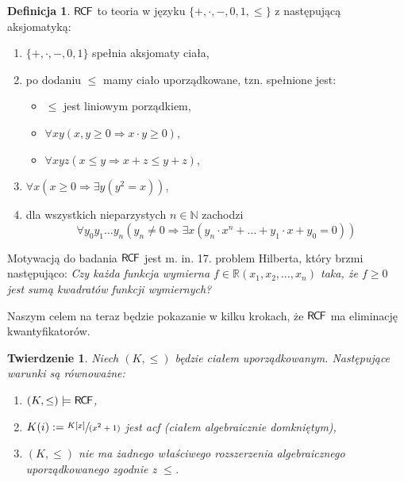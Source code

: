 \documentclass{article}
\newcommand{\N}{\mathbb{N}}
\newcommand{\R}{\mathbb{R}}
\theoremstyle{plain}
\newtheorem{tw}[thm]{Twierdzenie}
\theoremstyle{definition}
\newtheorem{df}[thm]{Definicja}
\theoremstyle{remark}
\newcommand{\RCF}{\mathsf{R \mkern-1.7mu C \mkern-1.4mu F}}
\begin{document}
\begin{df}
	 $\RCF$ to teoria w języku $\{ +, \cdot, -, 0, 1, \leq \}$
	 z następującą aksjomatyką:
	 \begin{enumerate}
		 \item $ \{+, \cdot, -, 0, 1\} $ spełnia aksjomaty ciała,
		 \item po dodaniu $\leq $ mamy ciało uporządkowane, tzn.
			 spełnione jest:
			 \begin{itemize}
				 \item $ \leq $ jest liniowym porządkiem,
				 \item $ \forall x y (x, y \geq 0 \Rightarrow
					 x\cdot y \geq 0) $,
				 \item $\forall x y z (x \leq y \Rightarrow x +
					 z \leq y + z ) $,
			 \end{itemize}

		 \item $ \forall x (x \geq 0 \Rightarrow \exists y ( y^2 = x )) $,
		 \item dla wszystkich nieparzystych $ n \in \N$ zachodzi
			 \[
				 \forall y_0 y_1 \ldots y_n (y_n \neq 0
				 \Rightarrow \exists x (y_n \cdot x^n + \ldots
				 + y_1 \cdot x + y_0 = 0))
		   \]
	 \end{enumerate}

\end{df}

Motywacją do badania $ \RCF $ jest m. in. 17. problem Hilberta, który brzmi
następująco:
\textit{Czy każda funkcja wymierna $ f \in \R(x_1, x_2, \ldots, x_n ) $ taka,
że $ f \geq 0 $ jest sumą kwadratów funkcji wymiernych?}

Naszym celem na teraz będzie pokazanie w kilku krokach, że $ \RCF $ ma
eliminację kwantyfikatorów.

\begin{tw}
\label{tw:rcf}
	 Niech $ (K, \leq) $ będzie ciałem uporządkowanym.
	 Następujące warunki są równoważne:
	 \begin{enumerate}
		 \item $(K, \leq) \models \RCF $,
		 \item $K(i) := \sfrac{K[x]}{(x^2 + 1)} $ jest acf (ciałem
			 algebraicznie domkniętym),
		 \item $ (K, \leq) $ nie ma żadnego właściwego rozszerzenia
			 algebraicznego uporządkowanego zgodnie z $ \leq $.
	 \end{enumerate}
\end{tw}
\end{document}
